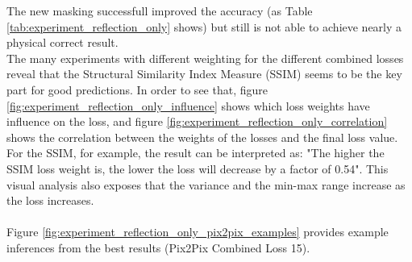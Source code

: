 		
		
		The new masking successfull improved the accuracy (as Table \ref{tab:experiment_reflection_only} shows) but still is not able to achieve nearly a physical correct result.\\
		The many experiments with different weighting for the different combined losses reveal that the Structural Similarity Index Measure (SSIM) seems to be the key part for good predictions. In order to see that, figure \ref{fig:experiment_reflection_only_influence} shows which loss weights have influence on the loss, and figure \ref{fig:experiment_reflection_only_correlation} shows the correlation between the weights of the losses and the final loss value. For the SSIM, for example, the result can be interpreted as: "The higher the SSIM loss weight is, the lower the loss will decrease by a factor of 0.54". This visual analysis also exposes that the variance and the min-max range increase as the loss increases.\\
		\\
		Figure \ref{fig:experiment_reflection_only_pix2pix_examples} provides example inferences from the best results (Pix2Pix Combined Loss 15).
		

